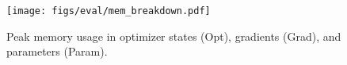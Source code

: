 \begin{figure}[htbp]
    \centering
    \texttt{[image: figs/eval/mem\_breakdown.pdf]}
    \captionsetup{justification=raggedright}
    \caption{Peak memory usage in optimizer states (Opt), gradients (Grad), and parameters (Param).}
    \captionsetup{justification=centering}
    \label{fig:mem_breakdown}
\end{figure}

